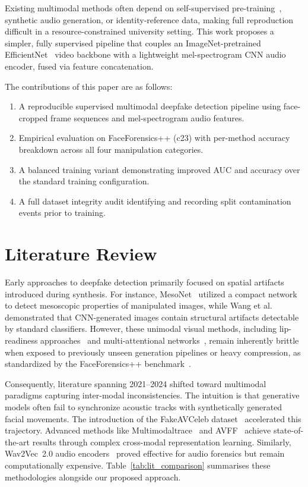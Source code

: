 \documentclass[conference]{IEEEtran}
\begin{document}
Existing multimodal methods often depend on self-supervised pre-training~\cite{baevski2020wav2vec2}, 
synthetic audio generation, or identity-reference data, making full reproduction difficult 
in a resource-constrained university setting. 
This work proposes a simpler, fully supervised pipeline that couples an ImageNet-pretrained 
EfficientNet~\cite{tan2019efficientnet} video backbone with a lightweight mel-spectrogram 
CNN audio encoder, fused via feature concatenation.

The contributions of this paper are as follows:
\begin{enumerate}
  \item A reproducible supervised multimodal deepfake detection pipeline using face-cropped 
        frame sequences and mel-spectrogram audio features.
  \item Empirical evaluation on FaceForensics++ (c23) with per-method accuracy breakdown 
        across all four manipulation categories.
  \item A balanced training variant demonstrating improved AUC and accuracy over the 
        standard training configuration.
  \item A full dataset integrity audit identifying and recording split contamination events 
        prior to training.
\end{enumerate}

\section{Literature Review}
\label{sec:related}

Early approaches to deepfake detection primarily focused on spatial artifacts introduced during synthesis. For instance, MesoNet~\cite{afchar2018mesonet} utilized a compact network to detect mesoscopic properties of manipulated images, while Wang et al.~\cite{wang2020cnn} demonstrated that CNN-generated images contain structural artifacts detectable by standard classifiers. However, these unimodal visual methods, including lip-readiness approaches~\cite{haliassos2021lips} and multi-attentional networks~\cite{zhao2021multi}, remain inherently brittle when exposed to previously unseen generation pipelines or heavy compression, as standardized by the FaceForensics++ benchmark~\cite{rossler2019faceforensics}.

Consequently, literature spanning 2021--2024 shifted toward multimodal paradigms capturing inter-modal inconsistencies. The intuition is that generative models often fail to synchronize acoustic tracks with synthetically generated facial movements. The introduction of the FakeAVCeleb dataset~\cite{fakeavceleb2022} accelerated this trajectory. Advanced methods like Multimodaltrace~\cite{cheng2023multimodaltrace} and AVFF~\cite{yang2024avff} achieve state-of-the-art results through complex cross-modal representation learning. Similarly, Wav2Vec~2.0 audio encoders~\cite{baevski2020wav2vec2} proved effective for audio forensics but remain computationally expensive. Table~\ref{tab:lit_comparison} summarises these methodologies alongside our proposed approach.
\end{document}
